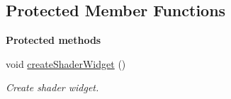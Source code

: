 \subsection*{Protected Member Functions}
\begin{Indent}\textbf{ Protected methods}\par
\begin{DoxyCompactItemize}
\item 
\mbox{\label{classrev_1_1_add_shader_command_afd4d5bce90dad6a7985b0bbb45cb4ed8}} 
void \mbox{\hyperlink{classrev_1_1_add_shader_command_afd4d5bce90dad6a7985b0bbb45cb4ed8}{create\+Shader\+Widget}} ()
\begin{DoxyCompactList}\small\item\em Create shader widget. \end{DoxyCompactList}\end{DoxyCompactItemize}
\end{Indent}
